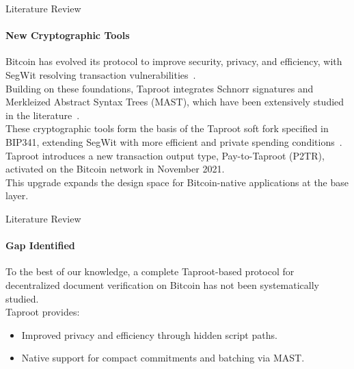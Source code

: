 \begin{frame}{Literature Review}
    \framesubtitle{New Cryptographic Tools}
Bitcoin has evolved its protocol to improve security, privacy, and efficiency, with SegWit resolving transaction vulnerabilities~\cite{segwit}.\\
\vspace*{0.2cm}
Building on these foundations, Taproot integrates Schnorr signatures and Merkleized Abstract Syntax Trees (MAST), which have been extensively studied in the literature~\cite{Gayoso2020AnalysisCryptographic,Fang2020DigitalSignature,Zhang2025HighEfficiencySchnorrMultiSignature}.\\
\vspace*{0.2cm}
These cryptographic tools form the basis of the Taproot soft fork specified in BIP341, extending SegWit with more efficient and private spending conditions~\cite{taproot}.\\
\vspace*{0.2cm}
Taproot introduces a new transaction output type, Pay-to-Taproot (P2TR), activated on the Bitcoin network in November 2021.\\
\vspace*{0.2cm}
This upgrade expands the design space for Bitcoin-native applications at the base layer.
\end{frame}


\begin{frame}{Literature Review}
    \framesubtitle{Gap Identified}
To the best of our knowledge, a complete Taproot-based protocol for decentralized document verification on Bitcoin has not been systematically studied.\\
\vspace*{0.3cm}
Taproot provides:
\begin{itemize}
    \item Improved privacy and efficiency through hidden script paths.
    \item Native support for compact commitments and batching via MAST.
\end{itemize}
\end{frame}

